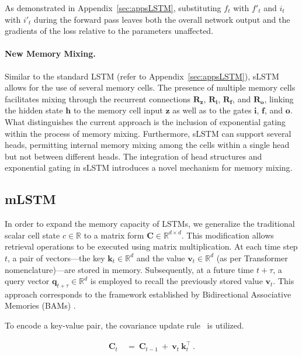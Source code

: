 As demonstrated in Appendix~\ref{sec:appsLSTM}, substituting $f_t$ with $f'_t$ and $i_t$ with $i'_t$ during the forward pass leaves both the overall network output and the gradients of the loss relative to the parameters unaffected.

\paragraph{New Memory Mixing.} Similar to the standard LSTM (refer to Appendix~\ref{sec:appsLSTM}), sLSTM allows for the use of several memory cells. The presence of multiple memory cells facilitates mixing through the recurrent connections $\mathbf{R}_{\mathbf{z}}$, $\mathbf{R}_{\mathbf{i}}$, $\mathbf{R}_{\mathbf{f}}$, and $\mathbf{R}_{\mathbf{o}}$, linking the hidden state $\mathbf{h}$ to the memory cell input $\mathbf{z}$ as well as to the gates $\mathbf{i}$, $\mathbf{f}$, and $\mathbf{o}$. What distinguishes the current approach is the inclusion of exponential gating within the process of memory mixing. Furthermore, sLSTM can support several heads, permitting internal memory mixing among the cells within a single head but not between different heads. The integration of head structures and exponential gating in sLSTM introduces a novel mechanism for memory mixing.

\subsection{mLSTM}
\label{sec:mLSTM}

In order to expand the memory capacity of LSTMs, we generalize the traditional scalar cell state $c \in \mathbb{R}$ to a matrix form $\mathbf{C} \in \mathbb{R}^{d \times d}$. This modification allows retrieval operations to be executed using matrix multiplication. At each time step $t$, a pair of vectors—the key $\mathbf{k}_t \in \mathbb{R}^d$ and the value $\mathbf{v}_t \in \mathbb{R}^d$ (as per Transformer nomenclature)—are stored in memory. Subsequently, at a future time $t + \tau$, a query vector $\mathbf{q}_{t+\tau} \in \mathbb{R}^d$ is employed to recall the previously stored value $\mathbf{v}_t$. This approach corresponds to the framework established by Bidirectional Associative Memories (BAMs) \citep{Kohonen:72,Anderson:72,Nakano:72,Anderson:77}.

To encode a key-value pair, the covariance update rule~\citep{Sejnowski:77,Dayan:91} is utilized.

\begin{align}
\mathbf{C}_t \ &= \ \mathbf{C}_{t-1} \ + \ \mathbf{v}_{t} \ \mathbf{k}_t^\top \ .
\end{align}

